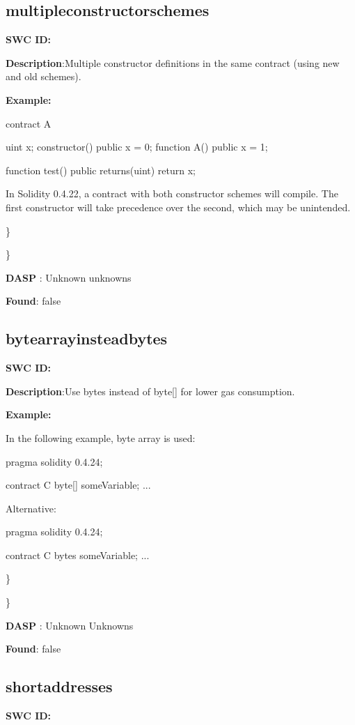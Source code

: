 \documentclass{article}
\begin{document}
{\subsection{multiple\textunderscore constructor\textunderscore schemes} 
\textbf{SWC \textunderscore ID:} 

\textbf{Description}:Multiple constructor definitions in the same contract (using new and old schemes).


\textbf{Example:} 

contract A {
    uint x;
    constructor() public {
        x = 0;
    }
    function A() public {
        x = 1;
    }

    function test() public returns(uint) {
        return x;
    }
}

In Solidity 0.4.22, a contract with both constructor schemes will compile. The first constructor will take precedence over the second, which may be unintended.

\} 

\} 

\textbf{DASP} : Unknown unknowns

\textbf{Found}: false

\subsection{byte\textunderscore array\textunderscore instead\textunderscore bytes} 
\textbf{SWC \textunderscore ID:} 

\textbf{Description}:Use bytes instead of byte[] for lower gas consumption.


\textbf{Example:} 

In the following example, byte array is used:

pragma solidity 0.4.24;

contract C {
    byte[] someVariable;
    ...
}

Alternative:

pragma solidity 0.4.24;

contract C {
    bytes someVariable;
    ...
}

\} 

\} 

\textbf{DASP} : Unknown Unknowns

\textbf{Found}: false

\subsection{short\textunderscore addresses} 
\textbf{SWC \textunderscore ID:} 

}
\end{document}
